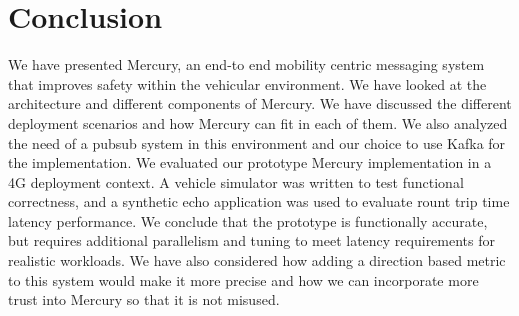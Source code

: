 \section{Conclusion}

We have presented Mercury, an end-to end mobility centric messaging
system that improves safety within the vehicular environment. We have
looked at the architecture and different components of Mercury. We
have discussed the different deployment scenarios and how Mercury can
fit in each of them. We also analyzed the need of a pubsub system in
this environment and our choice to use Kafka for the
implementation. We evaluated our prototype Mercury implementation in a
4G deployment context. A vehicle simulator was written to test
functional correctness, and a synthetic echo application was used to
evaluate rount trip time latency performance. We conclude that the
prototype is functionally accurate, but requires additional
parallelism and tuning to meet latency requirements for realistic
workloads. We have also considered how adding a direction based metric
to this system would make it more precise and how we can incorporate
more trust into Mercury so that it is not misused.
